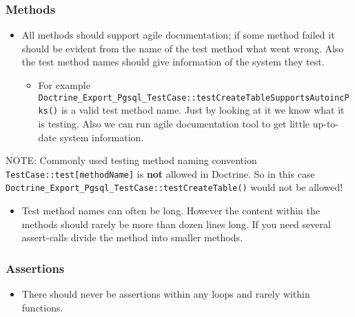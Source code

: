 \documentclass[11pt,a4paper]{report}
\begin{document}
\subsubsection{Methods}
\begin{itemize}
\item{All methods should support agile documentation; if some method failed it should be evident from the name of the test method what went wrong. Also the test method names should give information of the system they test.}
\begin{itemize}
\item{For example \texttt{Doctrine\_Export\_Pgsql\_TestCase::testCreateTableSupportsAutoincPks()} is a valid test method name. Just by looking at it we know what it is testing. Also we can run agile documentation tool to get little up-to-date system information.}
\end{itemize}
\end{itemize}
NOTE: Commonly used testing method naming convention \texttt{TestCase::test[methodName]} is \textbf{not} allowed in Doctrine. So in this case \texttt{Doctrine\_Export\_Pgsql\_TestCase::testCreateTable()} would not be allowed!

\begin{itemize}
\item{Test method names can often be long. However the content within the methods should rarely be more than dozen lines long. If you need several assert-calls divide the method into smaller methods.}
\end{itemize}
\subsubsection{Assertions}
\begin{itemize}
\item{There should never be assertions within any loops and rarely within functions.}
\end{itemize}
\end{document}
